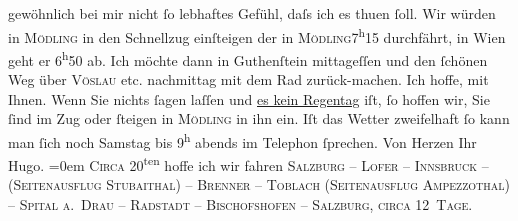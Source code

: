 \begin{ledgroupsized}[t]{13cm}
               gewöhnlich bei {\pb}mir nicht ſo
               lebhaftes Gefühl, daſs ich es thuen ſoll.\pend
           \pstart
           Wir würden in \textsc{Mödling} in den Schnellzug einſteigen
               der in \textsc{Mödling}7\textsuperscript{h}15 durchfährt, in Wien geht er 6\textsuperscript{h}50 ab.
               Ich möchte dann in Guthenſtein mittageſſen {\pb}und den ſchönen Weg über \textsc{Vöslau} etc. nachmittag mit dem Rad zurück-machen. Ich hoffe, mit Ihnen.\pend
           \pstart
           Wenn Sie nichts ſagen laſſen und \uline{es kein Regentag}
               iſt, ſo hoffen wir, Sie ſind im Zug oder ſteigen in \textsc{Mödling} in ihn ein.\pend
           \pstart
           {\pb}Iſt das Wetter zweifelhaft ſo
               kann man ſich noch Samstag bis 9\textsuperscript{h} abends im Telephon ſprechen.\pend
           \pstart
           Von Herzen Ihr{\\[\baselineskip]}\spacefill\mbox{Hugo.}\pend
           \leftskip=0em{}\pstart
           \noindent{}\textsc{Circa} 20\textsuperscript{ten} hoffe ich wir
                  fahren \textsc{Salzburg – Lofer – Innsbruck – (Seitenausflug
                        Stubaithal) – Brenner – Toblach (Seitenausflug Ampezzothal) – Spital a. Drau – Radstadt – Bischofshofen – Salzburg, circa 12 Tage}.\pend
                     \endnumbering{}\end{ledgroupsized}  \newcommand{\dateiname}{L01222}\newcommand{\titel}{Hugo von Hofmannsthal an Arthur Schnitzler, 1[1?]. 6. 1902}\newcommand{\editorInnen}{Martin Anton Müller und Gerd-Hermann Susen}
            \footnotesize
\begin{ledgroupsized}[t]{11.5cm}
\end{ledgroupsized}
         
      